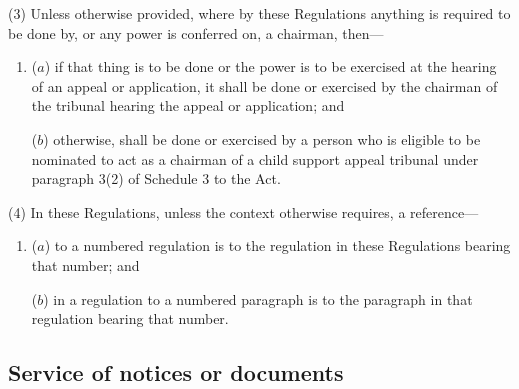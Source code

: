 \documentclass[12pt,a4paper]{article}
\begin{document}
(3) Unless otherwise provided, where by these Regulations anything is required to be done by, or any power is conferred on, a chairman, then---
\begin{enumerate}\item[]
($a$) if that thing is to be done or the power is to be exercised at the hearing of an appeal or application, it shall be done or exercised by the chairman of the tribunal hearing the appeal or application; and

($b$) otherwise, shall be done or exercised by a person who is eligible to be nominated to act as a chairman of a child support appeal tribunal under paragraph 3(2) of Schedule 3 to the Act.
\end{enumerate}

(4) In these Regulations, unless the context otherwise requires, a reference---
\begin{enumerate}\item[]
($a$) to a numbered regulation is to the regulation in these Regulations bearing that number; and

($b$) in a regulation to a numbered paragraph is to the paragraph in that regulation bearing that number.
\end{enumerate}


\subsection[2. Service of notices or documents]{Service of notices or documents}

%
%
%
\end{document}
